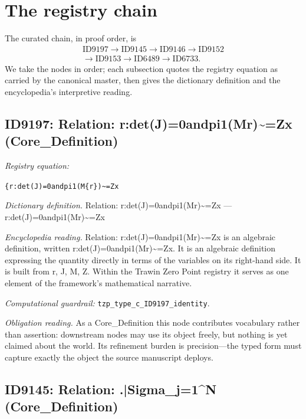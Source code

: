 \documentclass[11pt]{article}
\theoremstyle{remark}
\begin{document}
\section{The registry chain}
\label{sec:chain}

The curated chain, in proof order, is
\begin{equation*}
\begin{gathered}
\text{ID9197} \to \text{ID9145} \to \text{ID9146} \to \text{ID9152} \\
\to \text{ID9153} \to \text{ID6489} \to \text{ID6733}.
\end{gathered}
\end{equation*}
We take the nodes in order; each subsection quotes the registry equation as carried by the canonical master, then gives the dictionary definition and the encyclopedia's interpretive reading.

\subsection{ID9197: Relation: r:det(J)=0andpi1(Mr)\textasciitilde{}=Zx (Core\_Definition)}

\noindent\textit{Registry equation:}\par
{\small\texttt{\{r:det(J)=0andpi1(M\{r\})\textasciitilde{}=Zx}}\par\medskip
\noindent\textit{Dictionary definition.} Relation: r:det(J)=0andpi1(Mr)\textasciitilde{}=Zx --- r:det(J)=0andpi1(Mr)\textasciitilde{}=Zx\par\medskip
\noindent\textit{Encyclopedia reading.} Relation: r:det(J)=0andpi1(Mr)\textasciitilde{}=Zx is an algebraic definition, written r:det(J)=0andpi1(Mr)\textasciitilde{}=Zx. It is an algebraic definition expressing the quantity directly in terms of the variables on its right-hand side. It is built from r, J, M, Z. Within the Trawin Zero Point registry it serves as one element of the framework's mathematical narrative.
\par\medskip\noindent\textit{Computational guardrail:} \texttt{tzp\_type\_c\_ID9197\_identity}.
\par\medskip\noindent\textit{Obligation reading.} As a Core\_Definition this node contributes vocabulary rather than assertion: downstream nodes may use its object freely, but nothing is yet claimed about the world. Its refinement burden is precision---the typed form must capture exactly the object the source manuscript deploys.

\subsection{ID9145: Relation: .|Sigma\_j=1\textasciicircum{}N (Core\_Definition)}
\end{document}
